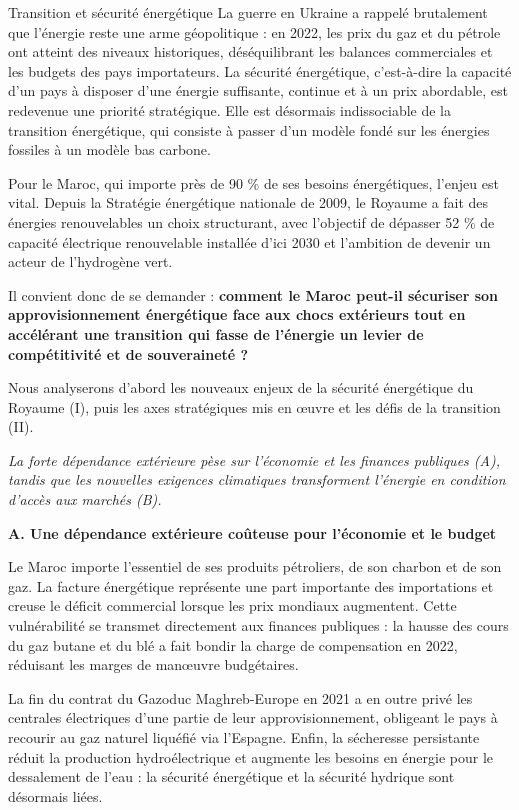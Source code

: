 \begin{copiemodele}{Transition et sécurité énergétique}
La guerre en Ukraine a rappelé brutalement que l'énergie reste une arme géopolitique : en 2022, les prix du gaz et du pétrole ont atteint des niveaux historiques, déséquilibrant les balances commerciales et les budgets des pays importateurs. La sécurité énergétique, c'est-à-dire la capacité d'un pays à disposer d'une énergie suffisante, continue et à un prix abordable, est redevenue une priorité stratégique. Elle est désormais indissociable de la transition énergétique, qui consiste à passer d'un modèle fondé sur les énergies fossiles à un modèle bas carbone.

Pour le Maroc, qui importe près de 90 \% de ses besoins énergétiques, l'enjeu est vital. Depuis la Stratégie énergétique nationale de 2009, le Royaume a fait des énergies renouvelables un choix structurant, avec l'objectif de dépasser 52 \% de capacité électrique renouvelable installée d'ici 2030 et l'ambition de devenir un acteur de l'hydrogène vert.

Il convient donc de se demander : \textbf{comment le Maroc peut-il sécuriser son approvisionnement énergétique face aux chocs extérieurs tout en accélérant une transition qui fasse de l'énergie un levier de compétitivité et de souveraineté ?}

Nous analyserons d'abord les nouveaux enjeux de la sécurité énergétique du Royaume (I), puis les axes stratégiques mis en œuvre et les défis de la transition (II).

\textit{La forte dépendance extérieure pèse sur l'économie et les finances publiques (A), tandis que les nouvelles exigences climatiques transforment l'énergie en condition d'accès aux marchés (B).}

\textbf{A. Une dépendance extérieure coûteuse pour l'économie et le budget}

Le Maroc importe l'essentiel de ses produits pétroliers, de son charbon et de son gaz. La facture énergétique représente une part importante des importations et creuse le déficit commercial lorsque les prix mondiaux augmentent. Cette vulnérabilité se transmet directement aux finances publiques : la hausse des cours du gaz butane et du blé a fait bondir la charge de compensation en 2022, réduisant les marges de manœuvre budgétaires.

La fin du contrat du Gazoduc Maghreb-Europe en 2021 a en outre privé les centrales électriques d'une partie de leur approvisionnement, obligeant le pays à recourir au gaz naturel liquéfié via l'Espagne. Enfin, la sécheresse persistante réduit la production hydroélectrique et augmente les besoins en énergie pour le dessalement de l'eau : la sécurité énergétique et la sécurité hydrique sont désormais liées.


\end{copiemodele}
